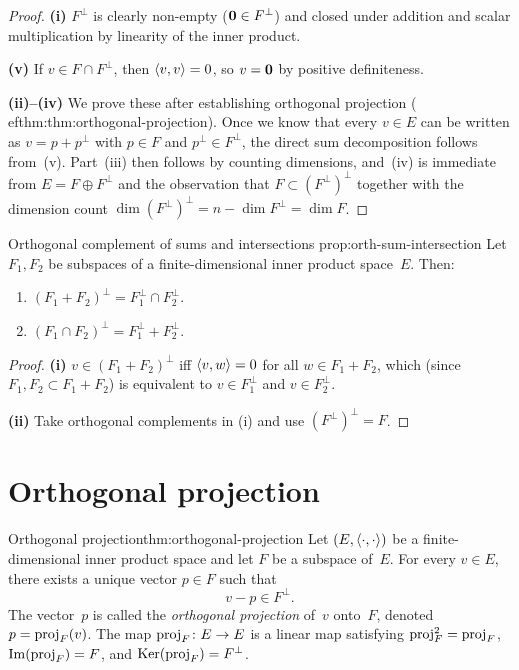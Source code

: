 \begin{proof}
\textbf{(i)} $F^{\perp}$ is clearly non-empty ($\mathbf{0}\in F^{\perp}$)
and closed under addition and scalar multiplication by linearity of the
inner product.

\textbf{(v)} If $v\in F\cap F^{\perp}$, then $\langle v,v\rangle = 0$, so
$v = \mathbf{0}$ by positive definiteness.

\textbf{(ii)--(iv)} We prove these after establishing orthogonal
projection (
ef{thm:thm:orthogonal-projection}).  Once we know that every
$v\in E$ can be written as $v = p + p^{\perp}$ with $p\in F$ and
$p^{\perp}\in F^{\perp}$, the direct sum decomposition follows
from~(v).  Part~(iii) then follows by counting dimensions, and~(iv)
is immediate from $E = F\oplus F^{\perp}$ and the observation that
$F\subset (F^{\perp})^{\perp}$ together with the dimension count
$\dim(F^{\perp})^{\perp} = n - \dim F^{\perp} = \dim F$.
\end{proof}

\begin{proposition}{Orthogonal complement of sums and intersections}%
{prop:orth-sum-intersection}
Let $F_1,F_2$ be subspaces of a finite-dimensional inner product
space~$E$.  Then:
\begin{enumerate}[label=(\roman*)]
  \item $(F_1 + F_2)^{\perp} = F_1^{\perp}\cap F_2^{\perp}$.
  \item $(F_1\cap F_2)^{\perp} = F_1^{\perp} + F_2^{\perp}$.
\end{enumerate}
\end{proposition}

\begin{proof}
\textbf{(i)} $v\in(F_1+F_2)^{\perp}$ iff $\langle v,w\rangle=0$ for all
$w\in F_1+F_2$, which (since $F_1,F_2\subset F_1+F_2$) is equivalent
to $v\in F_1^{\perp}$ and $v\in F_2^{\perp}$.

\textbf{(ii)} Take orthogonal complements in (i) and use
$(F^{\perp})^{\perp}=F$.
\end{proof}


\section{Orthogonal projection}\label{sec:orthogonal-projection}

\begin{theorem}{Orthogonal projection}{thm:orthogonal-projection}
Let $(E,\langle\cdot,\cdot\rangle)$ be a finite-dimensional inner product
space and let $F$ be a subspace of~$E$.  For every $v\in E$, there
exists a unique vector $p\in F$ such that
\[
  v - p \in F^{\perp}.
\]
The vector~$p$ is called the \emph{orthogonal projection} of~$v$
onto~$F$, denoted $p = \operatorname{proj}_F(v)$.  The map
$\operatorname{proj}_F\colon E\to E$ is a linear map satisfying
$\operatorname{proj}_F^2 = \operatorname{proj}_F$, $\operatorname{Im}(\operatorname{proj}_F) = F$, and
$\operatorname{Ker}(\operatorname{proj}_F) = F^{\perp}$.
\end{theorem}

